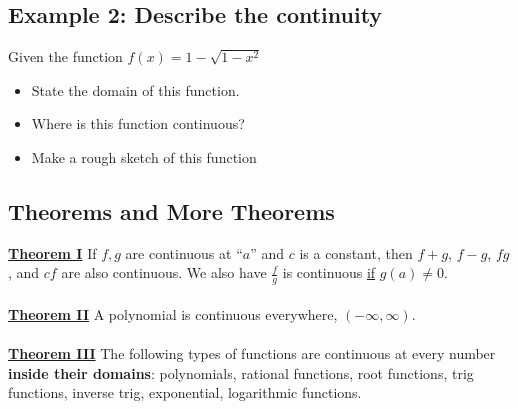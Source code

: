 \documentclass[10pt]{book}
\theoremstyle{definition}
\begin{document}
\subsection*{Example 2: Describe the continuity}
Given the function $f(x)=1-\sqrt{1-x^2}$
\begin{itemize}
    \item State the domain of this function.
    \item Where is this function continuous?
    \item Make a rough sketch of this function
\end{itemize}
\raggedbottom
\clearpage
\begin{tcolorbox}
\subsection*{Theorems and More Theorems}
\underline{\textbf{Theorem I}} If $f,g$ are continuous at ``$a$'' and $c$ is a constant, then $f+g$, $f-g$, $fg$, and $cf$ are also continuous. We also have $\displaystyle \frac{f}{g}$ is continuous \underline{if} $g(a)\neq 0$.\\ \\
\underline{\textbf{Theorem II}} A polynomial is continuous everywhere, $(-\infty,\infty)$.\\ \\
\underline{\textbf{Theorem III}} The following types of functions are continuous at every number \textbf{inside their domains}: polynomials, rational functions, root functions, trig functions, inverse trig, exponential, logarithmic functions.
\end{tcolorbox}
\end{document}
